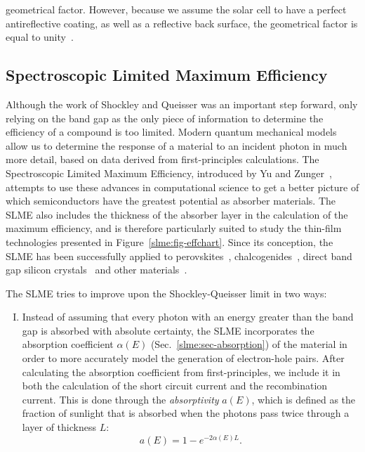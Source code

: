 \begin{refsection}
geometrical factor. However, because we assume the solar cell to have a 
perfect antireflective coating, as well as a reflective back surface, the 
geometrical factor is equal to unity~\cite{Ruhle2016}. 
 
 
\subsection{Spectroscopic Limited Maximum Efficiency} \label{slme:sec-SLME} 
 
Although the work of Shockley and Queisser was an important step forward, only 
relying on the band gap as the only piece of information to determine the 
efficiency of a compound is too limited. Modern quantum mechanical models 
allow us to determine the response of a material to an incident photon in much 
more detail, based on data derived from first-principles calculations. The 
Spectroscopic Limited Maximum Efficiency, introduced by Yu and 
Zunger~\cite{Yu2012}, attempts to use these advances in computational science 
to get a better picture of which semiconductors have the greatest potential as 
absorber materials. The SLME also includes the thickness of the absorber layer 
in the calculation of the maximum efficiency, and is therefore particularly 
suited to study the thin-film technologies presented in 
Figure~\ref{slme:fig-effchart}. Since its conception, the SLME has been 
successfully applied to perovskites~\cite{Yin2014, Yin2015, Yin2015b, 
Meng2016}, chalcogenides~\cite{Hong2016, Sarmadian2016}, direct band gap 
silicon crystals~\cite{Lee2014, Oh2015} and other materials~\cite{Yu2012b, 
Yokoyama2013, Heo2014, Huang2015}.  
 
The SLME tries to improve upon the Shockley-Queisser limit in two ways:  
\vspace{0.1in} 
\begin{enumerate}[I.] 
 
\item Instead of assuming that every photon with an energy greater than the 
band gap is absorbed with absolute certainty, the SLME incorporates the 
absorption coefficient $\alpha(E)$ (Sec.~\ref{slme:sec-absorption}) of the 
material in order to more accurately model the generation of electron-hole 
pairs. After calculating the absorption coefficient from first-principles, we 
include it in both the calculation of the short circuit current and the 
recombination current. This is done through the \textit{absorptivity} $a(E)$, 
which is defined as the fraction of sunlight that is absorbed when the photons 
pass twice through a layer of thickness $L$: 
\begin{equation} \label{slme:eq-absorptivity} 
a(E) = 1 - e^{-2 \alpha(E) L}. 
\end{equation} 
 

\end{enumerate}
\end{refsection}
